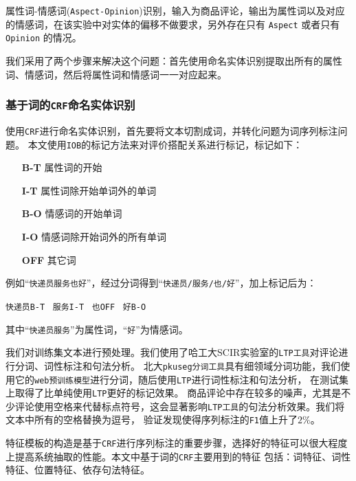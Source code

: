 \documentclass[11pt,a4paper]{article}
\begin{document}
属性词-情感词(\texttt{Aspect-Opinion})识别，输入为商品评论，输出为属性词以及对应的情感词，在该实验中对实体的偏移不做要求，另外存在只有 \texttt{Aspect} 或者只有 \texttt{Opinion} 的情况。

我们采用了两个步骤来解决这个问题：首先使用命名实体识别提取出所有的属性词、情感词，然后将属性词和情感词一一对应起来。



\subsubsection{基于词的\texttt{CRF}命名实体识别}

使用\texttt{CRF}进行命名实体识别，首先要将文本切割成词，并转化问题为词序列标注问题。
本文使用\texttt{IOB}的标记方法来对评价搭配关系进行标记，标记如下：

\begin{itemize}
  \item[\textbf{B-T}] 属性词的开始
  \item[\textbf{I-T}] 属性词除开始单词外的单词
  \item[\textbf{B-O}] 情感词的开始单词
  \item[\textbf{I-O}] 情感词除开始词外的所有单词
  \item[\textbf{OFF}] 其它词
\end{itemize}

例如“\texttt{快递员服务也好}”，经过分词得到“\texttt{快递员/服务/也/好}”，加上标记后为：

  \texttt{快递员B-T} \ 
  \texttt{服务I-T} \ 
  \texttt{也OFF} \ 
  \texttt{好B-O} \ 

其中“\texttt{快递员服务}”为属性词，“\texttt{好}”为情感词。

我们对训练集文本进行预处理。我们使用了哈工大SCIR实验室的\texttt{LTP工具}\cite{che2010ltp}对评论进行分词、词性标注和句法分析。
北大\texttt{pkuseg分词工具}\cite{pkuseg}具有细领域分词功能，我们使用它的\texttt{web预训练模型}进行分词，随后使用\texttt{LTP}进行词性标注和句法分析，
在测试集上取得了比单纯使用\texttt{LTP}更好的标记效果。
商品评论中存在较多的噪声，尤其是不少评论使用空格来代替标点符号，这会显著影响\texttt{LTP工具}的句法分析效果。我们将文本中所有的空格替换为逗号，
验证发现使得序列标注的\texttt{F1}值上升了$2\%$。

特征模板的构造是基于\texttt{CRF}进行序列标注的重要步骤，选择好的特征可以很大程度上提高系统抽取的性能。本文中基于词的\texttt{CRF}主要用到的特征
包括：词特征、词性特征、位置特征\cite{许力波2013产品评价对象与情感词搭配关系的抽取}、依存句法特征\cite{刘丽2015面向产品评论的细粒度情感分析}。
\end{document}

